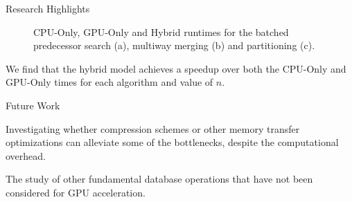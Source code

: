 \documentclass[final]{beamer}
\newlength{\colwidth}
\begin{document}
\begin{frame}[t]
\begin{columns}[t]
\begin{column}{\colwidth}
\begin{block}{Research Highlights}
 \begin{figure}[htp]
\centering
{}
   \caption{CPU-Only, GPU-Only and Hybrid runtimes for the batched predecessor search (a), multiway merging (b) and partitioning (c).}
   \label{fig:predecessor_search_results}
\end{figure}

\end{block} 
\begin{description}[font=$\bullet$~\normalfont\scshape\color{red!50!black}]
\item We find that the hybrid model achieves a speedup over both the CPU-Only and GPU-Only times for each algorithm and value of $n$. 
\end{description}


\begin{block}{Future Work}

\begin{description}[font=$\bullet$~\normalfont\scshape\color{red!50!black}]
\item Investigating whether compression schemes or other memory transfer optimizations can alleviate some of the bottlenecks, despite the computational overhead.
\item The study of other fundamental database operations that have not been considered for GPU acceleration.
\end{description}


\end{block}
\end{column}
\end{columns}
\end{frame}
\end{document}
